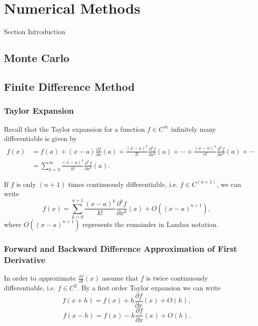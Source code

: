\chapter{Numerical Methods}
\label{sec:methods}


Section Introduction

\section{Monte Carlo}
\label{sec:methods:MC}

\section{Finite Difference Method}
\label{sec:methods:FD}

\subsection*{Taylor Expansion}
Recall that the Taylor expansion for a function $f\in C^\infty$ infinitely many differentiable is given by
\begin{align*}
f(x) &= f(a) + (x-a)\frac{\partial f}{\partial x}(a) + \frac{(x-a)^2}{2!}\frac{\partial^2 f}{\partial x^2}(a) + \cdots + \frac{(x-a)^n}{n!}\frac{\partial^n f}{\partial x^n}(a)+\cdots\\
&=\sum_{k = 0}^\infty \frac{(x-a)^k}{k!}\frac{\partial^k f}{\partial x^k}(a).
\end{align*}

If $f$ is only $(n+1)$ times continuously differentiable, i.e. $f\in C^{(n+1)}$, we can write
$$f(x)=\sum_{k = 0}^{n+1} \frac{(x-a)^k}{k!}\frac{\partial^k f}{\partial x^k}(x)+O((x-a)^{n+1}),$$
where $O((x-a)^{n+1})$ represents the remainder in Landau notation.

\subsection*{Forward and Backward Difference Approximation of First Derivative}
In order to approximate $\frac{\partial f}{\partial t}(x)$ assume that $f$ is twice continuously differentiable, i.e. $f\in C^2$.  By a first order Taylor expansion we can write
\begin{equation}\label{forwardTaylor}
f(x + h) =  f(x) + h \frac{\partial f}{\partial x}(x)+ O(h),
\end{equation}
\begin{equation}\label{backwardTaylor}
f(x - h) =  f(x) -h \frac{\partial f}{\partial x}(x)+ O(h).
\end{equation}

